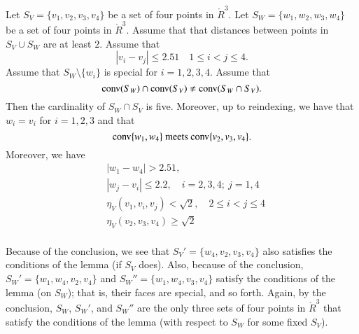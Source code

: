 \begin{tarskidata}
\begin{tarski}

\begin{lemma}
Let $S_V=\{v_1,v_2,v_3,v_4\}$ be a set of four
points in $\ring{R}^3$.  Let $S_W=\{w_1,w_2,w_3,w_4\}$ be a set
of four points in $\ring{R}^3$.  Assume that that distances
between points in $S_V\cup S_W$ are at least $2$.  Assume that
  $$
  |v_i-v_j|\le 2.51\quad 1\le i<j\le 4.
  $$
Assume that $S_W\setminus\{w_i\}$ is special for $i=1,2,3,4$.
Assume that 
  \begin{equation}\tlabel{tarski:eqn:cap}
  \op{conv}(S_W)\cap \op{conv}(S_V)\ne \op{conv}(S_W\cap S_V).
  \end{equation}
Then the cardinality of
$S_W\cap S_V$ is five.  Moreover, up to reindexing, we have
that $w_i=v_i$ for $i=1,2,3$ and that
  $$
  {\operatorname{conv}}\{w_1,w_4\} \text{ meets } {\operatorname{conv}}\{v_2,v_3,v_4\}.
  $$
Moreover, we have
  $$
  \begin{array}{lll}
  &|w_1-w_4|>2.51,\quad \\
  &|w_j-v_i|\le 2.2,\quad i=2,3,4;\ j=1,4\\
  &\eta_V(v_1,v_i,v_j) < \sqrt2,\quad 2\le i < j \le 4\\
  &\eta_V(v_2,v_3,v_4) \ge \sqrt2\\
  \end{array}
  $$
\end{lemma}

\begin{remark}
Because of the conclusion,
we see that $S_V'=\{w_4,v_2,v_3,v_4\}$ also satisfies the
conditions of the lemma (if $S_V$ does). 
Also, because of the conclusion,
$S_W' = \{w_1,w_4,v_2,v_4\}$ and $S_W''=\{w_1,w_4,v_3,v_4\}$
satisfy the conditions of the lemma (on $S_W$); that is,
their faces are special, and so forth.
Again, by the conclusion, $S_W$, $S_W'$, and $S_W''$ are the
only three sets of four points in $\ring{R}^3$ that satisfy
the conditions of the lemma (with respect to 
$S_W$ for some fixed $S_V$).
\end{remark}


\end{tarski}
\end{tarskidata}
